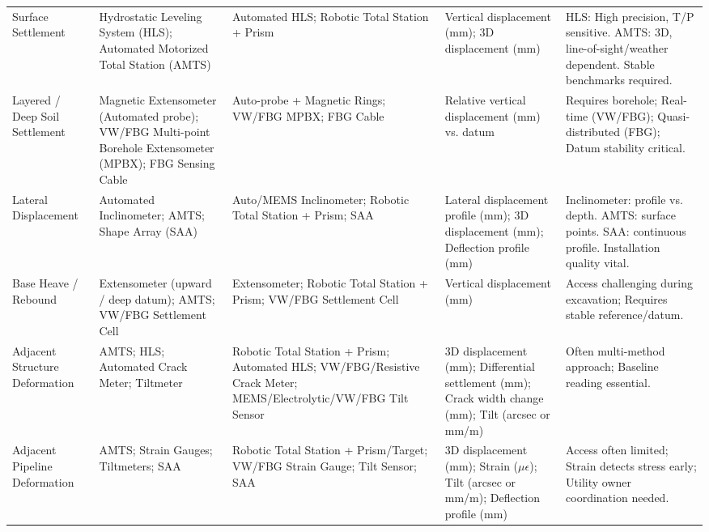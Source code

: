 \documentclass[preprint,11pt,authoryear,3p]{elsarticle}
\begin{document}
\begin{landscape}
\begin{longtable}{@{} >{\raggedright}p{3.5cm} >{\raggedright}p{4.5cm} >{\raggedright}p{5cm} >{\raggedright}p{4cm} >{\raggedright\arraybackslash}p{5.5cm} @{}}
    \multicolumn{5}{l}{\textbf{\textit{Deformation Monitoring}}} \\ \midrule
    Surface Settlement & Hydrostatic Leveling System (HLS); Automated Motorized Total Station (AMTS) & Automated HLS; Robotic Total Station + Prism & Vertical displacement (mm); 3D displacement (mm) & HLS: High precision, T/P sensitive. AMTS: 3D, line-of-sight/weather dependent. Stable benchmarks required. \\ 
    \midrule
    Layered / Deep Soil Settlement & Magnetic Extensometer (Automated probe); VW/FBG Multi-point Borehole Extensometer (MPBX); FBG Sensing Cable & Auto-probe + Magnetic Rings; VW/FBG MPBX; FBG Cable & Relative vertical displacement (mm) vs. datum & Requires borehole; Real-time (VW/FBG); Quasi-distributed (FBG); Datum stability critical. \\ 
    \midrule
    Lateral Displacement & Automated Inclinometer; AMTS; Shape Array (SAA) & Auto/MEMS Inclinometer; Robotic Total Station + Prism; SAA & Lateral displacement profile (mm); 3D displacement (mm); Deflection profile (mm) & Inclinometer: profile vs. depth. AMTS: surface points. SAA: continuous profile. Installation quality vital. \\ 
    \midrule
    Base Heave / Rebound & Extensometer (upward / deep datum); AMTS; VW/FBG Settlement Cell & Extensometer; Robotic Total Station + Prism; VW/FBG Settlement Cell & Vertical displacement (mm) & Access challenging during excavation; Requires stable reference/datum. \\ 
    \midrule
    Adjacent Structure Deformation & AMTS; HLS; Automated Crack Meter; Tiltmeter & Robotic Total Station + Prism; Automated HLS; VW/FBG/Resistive Crack Meter; MEMS/Electrolytic/VW/FBG Tilt Sensor & 3D displacement (mm); Differential settlement (mm); Crack width change (mm); Tilt (arcsec or mm/m) & Often multi-method approach; Baseline reading essential. \\ 
    \midrule
    Adjacent Pipeline Deformation & AMTS; Strain Gauges; Tiltmeters; SAA & Robotic Total Station + Prism/Target; VW/FBG Strain Gauge; Tilt Sensor; SAA & 3D displacement (mm); Strain ($\mu\epsilon$); Tilt (arcsec or mm/m); Deflection profile (mm) & Access often limited; Strain detects stress early; Utility owner coordination needed. \\ 
    \midrule
    

\end{longtable}
\end{landscape}
\end{document}
